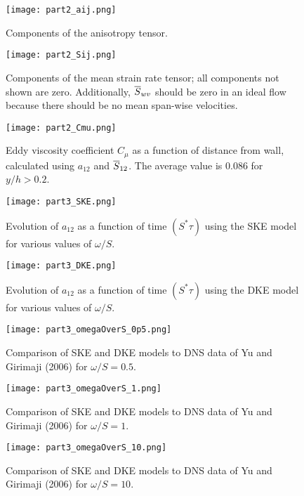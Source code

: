 \documentclass[11pt]{article}
\begin{document}
\begin{figure}[p]
\centering
\texttt{[image: part2\_aij.png]}
\vspace{6pt}
\caption{Components of the anisotropy tensor.}
\label{fig:part2_aij}
\end{figure}

\begin{figure}[p]
\centering
\texttt{[image: part2\_Sij.png]}
\vspace{6pt}
\caption{Components of the mean strain rate tensor; all components not shown are zero. Additionally, $\overline{S}_{wv}$ should be zero in an ideal flow because there should be no mean span-wise velocities.}
\label{fig:part2_Sij}
\end{figure}

\begin{figure}[p]
\centering
\texttt{[image: part2\_Cmu.png]}
\vspace{6pt}
\caption{Eddy viscosity coefficient $C_\mu$ as a function of distance from wall, calculated using $a_{12}$ and $\overline{S}_{12}$. The average value is 0.086 for $y/h > 0.2$.}
\label{fig:part2_Cmu}
\end{figure}

\begin{figure}[p]
\centering
\texttt{[image: part3\_SKE.png]}
\vspace{6pt}
\caption{Evolution of $a_{12}$ as a function of time $(S^* \tau)$ using the SKE model for various values of $\omega/S$.}
\label{fig:part3_SKE}
\end{figure}

\begin{figure}[p]
\centering
\texttt{[image: part3\_DKE.png]}
\vspace{6pt}
\caption{Evolution of $a_{12}$ as a function of time $(S^* \tau)$ using the DKE model for various values of $\omega/S$.}
\label{fig:part3_DKE}
\end{figure}

\begin{figure}[p]
\centering
\texttt{[image: part3\_omegaOverS\_0p5.png]}
\vspace{6pt}
\caption{Comparison of SKE and DKE models to DNS data of Yu and Girimaji (2006) for $\omega/S=0.5$.}
\label{fig:part3_omegaOverS_0p5}
\end{figure}

\begin{figure}[p]
\centering
\texttt{[image: part3\_omegaOverS\_1.png]}
\vspace{6pt}
\caption{Comparison of SKE and DKE models to DNS data of Yu and Girimaji (2006) for $\omega/S=1$.}
\label{fig:part3_omegaOverS_1}
\end{figure}

\begin{figure}[p]
\centering
\texttt{[image: part3\_omegaOverS\_10.png]}
\vspace{6pt}
\caption{Comparison of SKE and DKE models to DNS data of Yu and Girimaji (2006) for $\omega/S=10$.}
\label{fig:part3_omegaOverS_10}
\end{figure}

\end{document}
